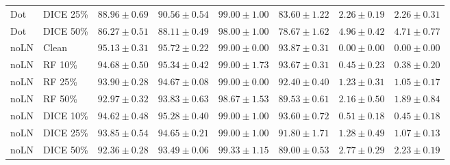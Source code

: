 {\begin{longtable}{llrrrrrr}
Dot & DICE 25\% & $88.96\pm0.69$ & $90.56\pm0.54$ & $99.00\pm1.00$ & $83.60\pm1.22$ & $2.26\pm0.19$ & $2.26\pm0.31$ \\
Dot & DICE 50\% & $86.27\pm0.51$ & $88.11\pm0.49$ & $98.00\pm1.00$ & $78.67\pm1.62$ & $4.96\pm0.42$ & $4.71\pm0.77$ \\
noLN & Clean & $95.13\pm0.31$ & $95.72\pm0.22$ & $99.00\pm0.00$ & $93.87\pm0.31$ & $0.00\pm0.00$ & $0.00\pm0.00$ \\
noLN & RF 10\% & $94.68\pm0.50$ & $95.34\pm0.42$ & $99.00\pm1.73$ & $93.67\pm0.31$ & $0.45\pm0.23$ & $0.38\pm0.20$ \\
noLN & RF 25\% & $93.90\pm0.28$ & $94.67\pm0.08$ & $99.00\pm0.00$ & $92.40\pm0.40$ & $1.23\pm0.31$ & $1.05\pm0.17$ \\
noLN & RF 50\% & $92.97\pm0.32$ & $93.83\pm0.63$ & $98.67\pm1.53$ & $89.53\pm0.61$ & $2.16\pm0.50$ & $1.89\pm0.84$ \\
noLN & DICE 10\% & $94.62\pm0.48$ & $95.28\pm0.40$ & $99.00\pm1.00$ & $93.60\pm0.72$ & $0.51\pm0.18$ & $0.45\pm0.18$ \\
noLN & DICE 25\% & $93.85\pm0.54$ & $94.65\pm0.21$ & $99.00\pm1.00$ & $91.80\pm1.71$ & $1.28\pm0.49$ & $1.07\pm0.13$ \\
noLN & DICE 50\% & $92.36\pm0.28$ & $93.49\pm0.06$ & $99.33\pm1.15$ & $89.00\pm0.53$ & $2.77\pm0.29$ & $2.23\pm0.19$ \\
\end{longtable}
}

